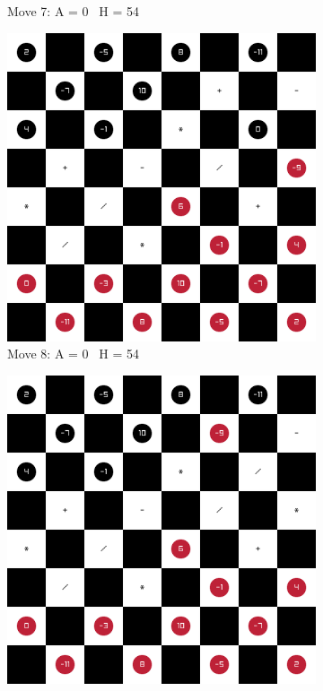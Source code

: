 \begin{figure}[H]
\begin{subfigure}{0.3\textwidth}
        \caption*{Move 7: A = 0 \textbar\ H = 54}
    \end{subfigure}
    \quad
    \begin{subfigure}{0.3\textwidth}
        \centering
        \includegraphics[width=\textwidth]{images/games/game1/move_9.png}
        \caption*{Move 8: A = 0 \textbar\ H = 54}
    \end{subfigure}
    \quad
    \begin{subfigure}{0.3\textwidth}
        \centering
        \includegraphics[width=\textwidth]{images/games/game1/move_10.png}

\end{subfigure}
\end{figure}
